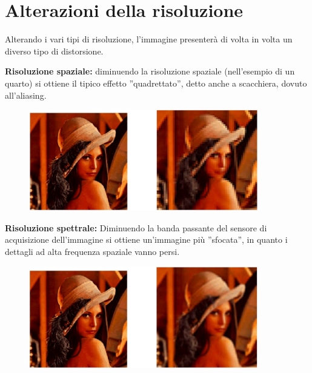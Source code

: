\section{Alterazioni della risoluzione}

Alterando i vari tipi di risoluzione, l'immagine presenterà di volta in volta un
diverso tipo di distorsione.

\begin{trivlist}
    \item \textbf{Risoluzione spaziale:} diminuendo la risoluzione spaziale
    (nell'esempio di un quarto) si ottiene il tipico effetto ”quadrettato”,
    detto anche a scacchiera, dovuto all'aliasing.
    \begin{figure}[H]
        \centering
        \includegraphics[width=10cm, keepaspectratio]{capitoli/immagini/imgs/esempio_risoluzione_spaziale.jpg}
    \end{figure}

    \item \textbf{Risoluzione spettrale:} Diminuendo la banda passante del
    sensore di acquisizione dell'immagine si ottiene un'immagine più ”sfocata”,
    in quanto i dettagli ad alta frequenza spaziale vanno persi.
    \begin{figure}[H]
        \centering
        \includegraphics[width=10cm, keepaspectratio]{capitoli/immagini/imgs/esempio_risoluzione_spettrale.jpg}
    \end{figure}


\end{trivlist}
